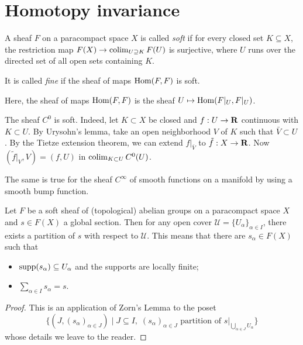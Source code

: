 \documentclass[a4paper,openany]{scrbook}
\begin{document}
\section{Homotopy invariance}

\begin{defn} A sheaf $F$ on a paracompact space $X$ is called \emph{soft} if for every closed set $K \subseteq X$, the restriction map $F(X) \to \operatorname*{colim}_{U \supseteq K} F(U)$ is surjective, where $U$ runs over the directed set of all open sets containing $K$.

It is called \emph{fine} if the sheaf of maps $\operatorname{Hom}(F,F)$ is soft.
\end{defn}
Here, the sheaf of maps $\operatorname{Hom}(F,F)$ is the sheaf $U \mapsto \operatorname{Hom}(F|_U,F|_U)$.


\begin{example}
The sheaf $C^0$ is soft. Indeed, let $K \subset X$ be closed and $f:U \to \mathbf R$ continuous with $K \subset U$. By Urysohn's lemma, take an open neighborhood $V$ of $K$ such that $\bar{V} \subset U$. By the Tietze extension theorem, we can extend $f|_{\bar{V}}$ to $\tilde{f}:X \to \mathbf R$. Now $(\tilde{f}|_V,V) = (f,U)$ in $\operatorname*{colim}_{K \subset U}C^0(U)$.

 The same is true for the sheaf $C^\infty$ of smooth functions on a manifold by using a smooth bump function.
\end{example}

\begin{lemma}\label{lemma:sheafpartitionofunity}
Let $F$ be a soft sheaf of (topological) abelian groups on a paracompact space $X$ and $s \in F(X)$ a global section. Then for any open cover $\mathcal U = \{U_\alpha\}_{\alpha \in I}$, there exists a partition of $s$ with respect to $\mathcal U$. This means that there are $s_\alpha \in F(X)$ such that
\begin{itemize}
\item $\operatorname{supp}(s_\alpha) \subseteq U_\alpha$ and the supports are locally finite;
\item $\sum_{\alpha \in I} s_\alpha = s$.
\end{itemize}
\end{lemma}
\begin{proof}
This is an application of Zorn's Lemma to the poset
\[
\{(J,(s_\alpha)_{\alpha \in J}) \mid J \subseteq I,\; (s_\alpha)_{\alpha \in J} \text{ partition of }s|_{\bigcup_{\alpha \in J} U_\alpha}\}
\]
whose details we leave to the reader.
\end{proof}
\end{document}
